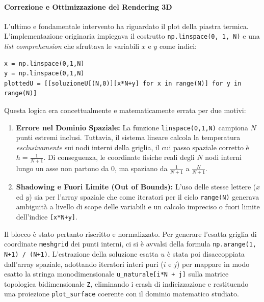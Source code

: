 \documentclass[twocolumn]{article}
\begin{document}
\paragraph{Correzione e Ottimizzazione del Rendering 3D}
L'ultimo e fondamentale intervento ha riguardato il plot della piastra termica. 
L'implementazione originaria impiegava il costrutto \texttt{np.linspace(0, 1, N)} 
e una \textit{list comprehension} che sfruttava le variabili $x$ e $y$ come indici:
\begin{verbatim}
x = np.linspace(0,1,N)
y = np.linspace(0,1,N)
plottedU = [[soluzioneU[(N,0)][x*N+y] for x in range(N)] for y in range(N)]
\end{verbatim}

Questa logica era concettualmente e matematicamente errata per due motivi:
\begin{enumerate}
    \item \textbf{Errore nel Dominio Spaziale:} La funzione \texttt{linspace(0,1,N)} 
    campiona $N$ punti estremi inclusi. Tuttavia, il sistema lineare calcola la temperatura 
    \textit{esclusivamente} sui nodi interni della griglia, il cui passo spaziale corretto 
    è $h = \frac{1}{N+1}$. Di conseguenza, le coordinate fisiche reali degli $N$ nodi interni
     lungo un asse non partono da $0$, ma spaziano da $\frac{1}{N+1}$ a $\frac{N}{N+1}$.
    \item \textbf{Shadowing e Fuori Limite (Out of Bounds):} L'uso delle stesse lettere ($x$ ed $y$) 
    sia per l'array spaziale che come iteratori per il ciclo \texttt{range(N)} generava ambiguità a 
    livello di scope delle variabili e un calcolo impreciso o fuori limite dell'indice \texttt{[x*N+y]}.
\end{enumerate}

Il blocco è stato pertanto riscritto e normalizzato. Per generare l'esatta griglia di coordinate
 \texttt{meshgrid} dei punti interni, ci si è avvalsi della formula \texttt{np.arange(1, N+1) / (N+1)}. 
 L'estrazione della soluzione esatta $u$ è stata poi disaccoppiata dall'array spaziale, adottando iteratori 
 interi puri ($i$ e $j$) per mappare in modo esatto la stringa monodimensionale \texttt{u\_naturale[i*N + j]} 
 sulla matrice topologica bidimensionale \texttt{Z}, eliminando i crash di indicizzazione e restituendo una proiezione 
 \texttt{plot\_surface} coerente con il dominio matematico studiato.
\end{document}
